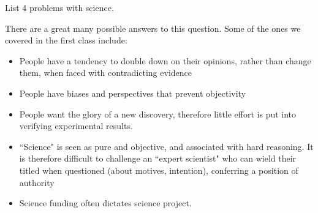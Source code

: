 \documentclass[addpoints,12pt]{exam}
\begin{document}
\begin{questions}
\begin{minipage}{\linewidth}
\end{minipage}

\clearpage

\bonusquestion[4] List 4 problems with science.
\begin{TheSolution}
	There are a great many possible answers to this question. Some of the ones we covered in the first class include:
\begin{itemize}
	\item People have a tendency to double down on their opinions, rather than change them, when faced with contradicting evidence
\item People have biases and perspectives that prevent objectivity
\item People want the glory of a new discovery, therefore little effort is put into verifying experimental results.
\item ``Science" is seen as pure and objective, and associated with hard reasoning. It is therefore difficult to challenge an ``expert scientist" who can wield their titled when questioned (about motives, intention), conferring a position of authority
\item Science funding often dictates science project.
\end{itemize}
\end{TheSolution}


\end{questions}
\end{document}
